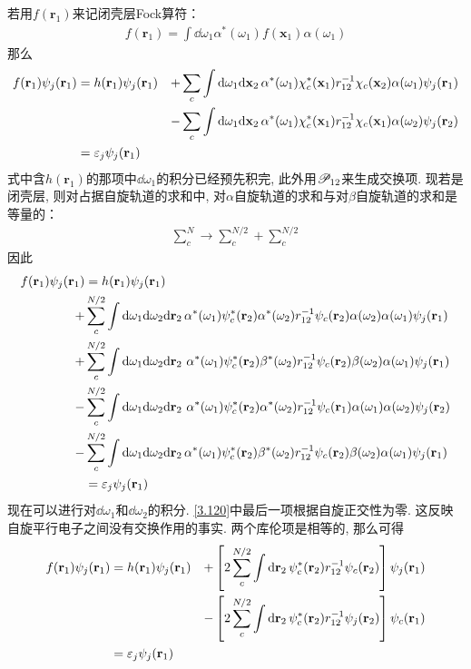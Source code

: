 若用$f(\mathbf{r}_1)$来记闭壳层Fock算符：
\begin{align}
f(\mathbf{r}_1) = \int\dd\omega_1\alpha^*(\omega_1)f(\mathbf{x}_1)\alpha(\omega_1)
\end{align}
那么
\begin{alignat}{3}
f(\mathbf{r}_1)\psi_j(\mathbf{r}_1) &= h(\mathbf{r}_1)\psi_j(\mathbf{r}_1) &+ \sum_c\int\dd\omega_1\dd{x}_2\,\alpha^*(\omega_1)\chi_c^*(\mathbf{x}_1)\twoe\chi_c(\mathbf{x}_2)\alpha(\omega_1)\psi_j(\mathbf{r}_1)\notag\\
&&-\sum_c\int\dd\omega_1\dd{x}_2\,\alpha^*(\omega_1)\chi_c^*(\mathbf{x}_1)\twoe\chi_c(\mathbf{x}_1)\alpha(\omega_2)\psi_j(\mathbf{r}_2)\notag\\
&=\epsilon_j\psi_j(\mathbf{r}_1)&
\end{alignat}
式中含$h(\mathbf{r}_1)$的那项中$\dd\omega_1$的积分已经预先积完, 此外用$\mathscr{P}_{12}$来生成交换项. 现若是闭壳层, 则对占据自旋轨道的求和中, 对$\alpha$自旋轨道的求和与对$\beta$自旋轨道的求和是等量的：
\begin{align}
\sum_c^N\to \sum_c^{N/2} + \sum_c^{N/2}
\end{align}
因此
\begin{align}
f(\mathbf{r}_1)\psi_j(\mathbf{r}_1) & = h(\mathbf{r}_1)\psi_j(\mathbf{r}_1)\notag\\
+ & \sum_c^{N/2}\int\dd\omega_1\dd\omega_2\dd{r}_2\,\alpha^*(\omega_1)\psi_c^*(\mathbf{r}_2)\alpha^*(\omega_2)\twoe\psi_c(\mathbf{r}_2)\alpha(\omega_2)\alpha(\omega_1)\psi_j(\mathbf{r}_1)\notag\\
+ & \sum_c^{N/2}\int\dd\omega_1\dd\omega_2\dd{r}_2\,\,\alpha^*(\omega_1)\psi_c^*(\mathbf{r}_2)\beta^*(\omega_2)\twoe\psi_c(\mathbf{r}_2)\beta(\omega_2)\alpha(\omega_1)\psi_j(\mathbf{r}_1)\notag\\
- & \sum_c^{N/2}\int\dd\omega_1\dd\omega_2\dd{r}_2\,\,\alpha^*(\omega_1)\psi_c^*(\mathbf{r}_2)\alpha^*(\omega_2)\twoe\psi_c(\mathbf{r}_1)\alpha(\omega_1)\alpha(\omega_2)\psi_j(\mathbf{r}_2)\notag\\
- & \sum_c^{N/2}\int\dd\omega_1\dd\omega_2\dd{r}_2\,\alpha^*(\omega_1)\psi_c^*(\mathbf{r}_2)\beta^*(\omega_2)\twoe\psi_c(\mathbf{r}_2)\beta(\omega_2)\alpha(\omega_1)\psi_j(\mathbf{r}_1)\notag\\
& = \epsilon_j\psi_j(\mathbf{r}_1)
\label{3.120}
\end{align}
现在可以进行对$\dd\omega_1$和$\dd\omega_2$的积分. \eqref{3.120}中最后一项根据自旋正交性为零. 这反映自旋平行电子之间没有交换作用的事实. 两个库伦项是相等的, 那么可得
\begin{alignat}{3}
f(\mathbf{r}_1)\psi_j(\mathbf{r}_1) & = h(\mathbf{r}_1)\psi_j(\mathbf{r}_1) & + \left[ 2\sum_c^{N/2}\int\dd{r}_2\,\psi_c^*(\mathbf{r}_2)\twoe\psi_c(\mathbf{r}_2)\right]\psi_j(\mathbf{r}_1)\notag\\
& & - \left[ 2\sum_c^{N/2}\int\dd{r}_2\,\psi_c^*(\mathbf{r}_2)\twoe\psi_j(\mathbf{r}_2)\right]\psi_c(\mathbf{r}_1)\notag\\
& = \epsilon_j\psi_j(\bfr_1)&
\end{alignat}
